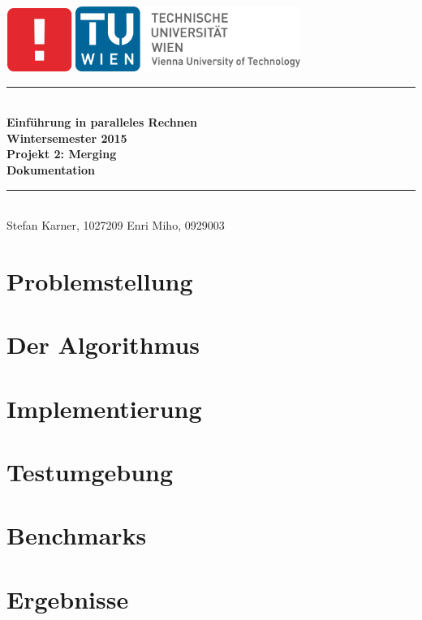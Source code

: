 \documentclass[a4paper,12pt]{article}
\begin{document}
\thispagestyle{empty}
\begin{center}
 \includegraphics[width=0.16\textwidth]{resources/informatik_logo}
\includegraphics[width=0.55\textwidth]{resources/tu_logo}\\[1cm]
\newcommand{\HRule}{\rule{\linewidth}{0.5mm}}
\HRule \\[0.4cm]
{ \Large \bfseries Einführung in paralleles Rechnen\\
Wintersemester 2015\\ [0.2cm]
Projekt 2: Merging \\ [0.2cm]
Dokumentation}\\[0.4cm]

\HRule \\[1.5cm]
{\large
Stefan Karner, 1027209 \hfill Enri Miho, 0929003
}
\end{center}

\newpage
\tableofcontents
\newpage
\section{Problemstellung}
	

\section{Der Algorithmus}
	

\section{Implementierung}
	

\section{Testumgebung}
	
	
\section{Benchmarks}
	
	
\section{Ergebnisse}
	

\newpage


\end{document}
